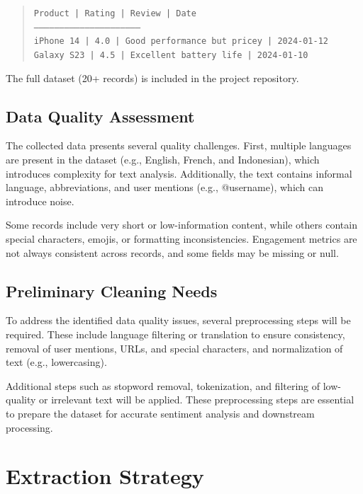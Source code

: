 \documentclass[12pt]{article}
\begin{document}
\begin{quote}
\texttt{Product        | Rating | Review                        | Date} \\
\texttt{--------------------------------------------------------------} \\
\texttt{iPhone 14      | 4.0    | Good performance but pricey   | 2024-01-12} \\
\texttt{Galaxy S23     | 4.5    | Excellent battery life        | 2024-01-10}
\end{quote}

The full dataset (20+ records) is included in the project repository.

\subsection{Data Quality Assessment}
The collected data presents several quality challenges. First, multiple languages are present in the dataset (e.g., English, French, and Indonesian), which introduces complexity for text analysis. Additionally, the text contains informal language, abbreviations, and user mentions (e.g., @username), which can introduce noise.

Some records include very short or low-information content, while others contain special characters, emojis, or formatting inconsistencies. Engagement metrics are not always consistent across records, and some fields may be missing or null.

\subsection{Preliminary Cleaning Needs}
To address the identified data quality issues, several preprocessing steps will be required. These include language filtering or translation to ensure consistency, removal of user mentions, URLs, and special characters, and normalization of text (e.g., lowercasing).

Additional steps such as stopword removal, tokenization, and filtering of low-quality or irrelevant text will be applied. These preprocessing steps are essential to prepare the dataset for accurate sentiment analysis and downstream processing.

\section{Extraction Strategy}
\end{document}
